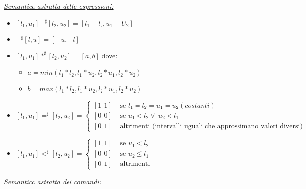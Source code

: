\documentclass{article}
\begin{document}
                \noindent
                \textit{\underline{Semantica astratta delle espressioni:}}
                \begin{itemize}
                    \item $[l_1, u_1] +^\sharp [l_2, u_2] = [l_1 + l_2, u_1 + U_2]$
                    \item $-^\sharp[l, u] = [-u, -l]$
                    \item $[l_1, u_1] *^\sharp [l_2, u_2] = [a, b]$ dove:
                    \begin{itemize}
                        \item $a=min(l_1*l_2, l_1*u_2, l_2*u_1, l_2*u_2)$
                        \item $b=max(l_1*l_2, l_1*u_2, l_2*u_1, l_2*u_2)$
                    \end{itemize}
                    \item $[l_1, u_1] =^\sharp [l_2, u_2] =
                    \begin{cases}
                    [1, 1] &\text{ se } l_1=l_2=u_1=u_2 (costanti) \\
                    [0, 0] &\text{ se } u_1 < l_2 \lor ~u_2 < l_1\\
                    [0, 1] &\text{ altrimenti (intervalli uguali che approssimano valori diversi) }
                    \end{cases}$
                    \item $[l_1, u_1] <^\sharp [l_2, u_2] =
                    \begin{cases}
                    [1, 1] &\text{ se } u_1<l_2 \\
                    [0, 0] &\text{ se } u_2 \leq l_1 \\
                    [0, 1] &\text{ altrimenti }
                    \end{cases}$
                \end{itemize}

                \underline{\textit{Semantica astratta dei comandi:}}
\end{document}
